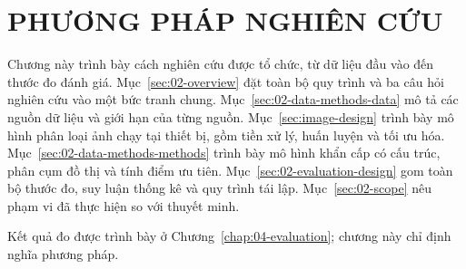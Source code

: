 \chapter{PHƯƠNG PHÁP NGHIÊN CỨU}\label{chap:02-data-methods}
Chương này trình bày cách nghiên cứu được tổ chức, từ dữ liệu đầu vào đến thước đo đánh giá. Mục~\ref{sec:02-overview} đặt toàn bộ quy trình và ba câu hỏi nghiên cứu vào một bức tranh chung. Mục~\ref{sec:02-data-methods-data} mô tả các nguồn dữ liệu và giới hạn của từng nguồn. Mục~\ref{sec:image-design} trình bày mô hình phân loại ảnh chạy tại thiết bị, gồm tiền xử lý, huấn luyện và tối ưu hóa. Mục~\ref{sec:02-data-methods-methods} trình bày mô hình khẩn cấp có cấu trúc, phân cụm đồ thị và tính điểm ưu tiên. Mục~\ref{sec:02-evaluation-design} gom toàn bộ thước đo, suy luận thống kê và quy trình tái lập. Mục~\ref{sec:02-scope} nêu phạm vi đã thực hiện so với thuyết minh.

Kết quả đo được trình bày ở Chương~\ref{chap:04-evaluation}; chương này chỉ định nghĩa phương pháp.






